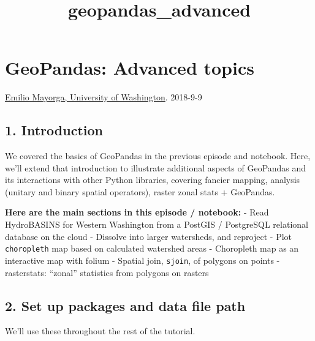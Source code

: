\documentclass[11pt]{article}
\title{geopandas\_advanced}
\begin{document}
    
    
    \maketitle
    
    

    
    \hypertarget{geopandas-advanced-topics}{%
\section{GeoPandas: Advanced topics}\label{geopandas-advanced-topics}}

\href{https://github.com/emiliom/}{Emilio Mayorga, University of
Washington}. 2018-9-9

    \hypertarget{introduction}{%
\subsection{1. Introduction}\label{introduction}}

    We covered the basics of GeoPandas in the previous episode and notebook.
Here, we'll extend that introduction to illustrate additional aspects of
GeoPandas and its interactions with other Python libraries, covering
fancier mapping, analysis (unitary and binary spatial operators), raster
zonal stats + GeoPandas.

\textbf{Here are the main sections in this episode / notebook:} - Read
HydroBASINS for Western Washington from a PostGIS / PostgreSQL
relational database on the cloud - Dissolve into larger watersheds, and
reproject - Plot \texttt{choropleth} map based on calculated watershed
areas - Choropleth map as an interactive map with folium - Spatial join,
\texttt{sjoin}, of polygons on points - rasterstats: ``zonal''
statistics from polygons on rasters

    \hypertarget{set-up-packages-and-data-file-path}{%
\subsection{2. Set up packages and data file
path}\label{set-up-packages-and-data-file-path}}

We'll use these throughout the rest of the tutorial.
\end{document}
